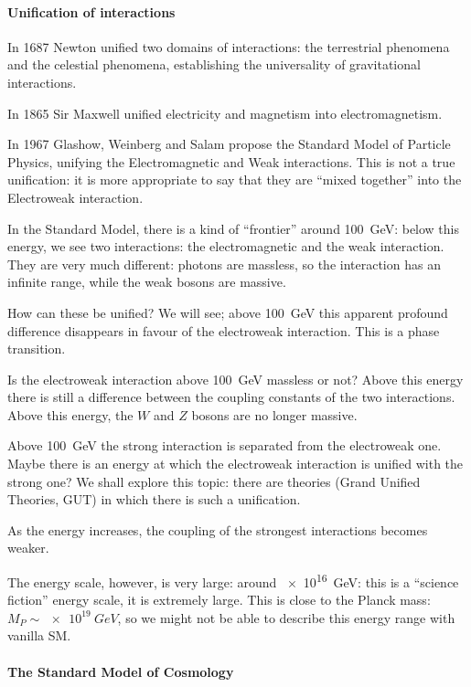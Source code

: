 \documentclass[main.tex]{subfiles}
\begin{document}
\paragraph{Unification of interactions}

In 1687 Newton unified two domains of interactions: the terrestrial phenomena and the celestial phenomena, establishing the universality of gravitational interactions. 

In 1865 Sir Maxwell unified electricity and magnetism into electromagnetism. 

In 1967 Glashow, Weinberg and Salam propose the Standard Model of Particle Physics, unifying the Electromagnetic and Weak interactions. 
This is not a true unification: it is more appropriate to say that they are ``mixed together'' into the Electroweak interaction.  

In the Standard Model, there is a kind of ``frontier'' around \SI{100}{GeV}: below this energy, we see two interactions: the electromagnetic and the weak interaction. 
They are very much different: photons are massless, so the interaction has an infinite range, while the weak bosons are massive. 

How can these be unified? We will see; above \SI{100}{GeV} this apparent profound difference disappears in favour of the electroweak interaction. 
This is a phase transition.

Is the electroweak interaction above \SI{100}{GeV} massless or not?
Above this energy there is still a difference between the coupling constants of the two interactions.
Above this energy, the \(W\) and \(Z\) bosons are no longer massive. 

Above \SI{100}{GeV} the strong interaction is separated from the electroweak one. Maybe there is an energy at which the electroweak interaction is unified with the strong one? 
We shall explore this topic: there are theories (Grand Unified Theories, GUT) in which there is such a unification.

As the energy increases, the coupling of the strongest interactions becomes weaker.

The energy scale, however, is very large: around \SI{e16}{GeV}: this is a ``science fiction'' energy scale, it is extremely large. 
This is close to the Planck mass: \(M_P  \sim \SI{e19}{GeV}\), so we might not be able to describe this energy range with vanilla SM. 

\paragraph{The Standard Model of Cosmology}
\end{document}
